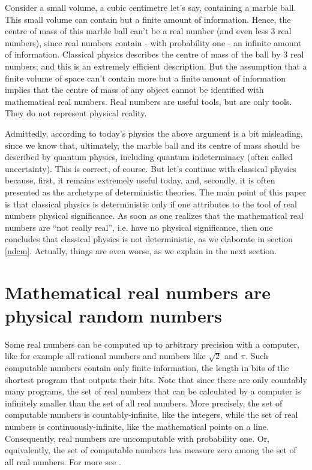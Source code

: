 \documentclass[pra,aps,groupedaddress,twocolumn,floatfix,nofootinbib]{revtex4}
\begin{document}
Consider a small volume, a cubic centimetre let's say, containing a marble ball. This small volume can contain but a finite amount of information. Hence, the centre of mass of this marble ball can't be a real number (and even less 3 real numbers), since real numbers contain - with probability one - an infinite amount of information. Classical physics describes the centre of mass of the ball by 3 real numbers; and this is an extremely efficient description. But the assumption that a finite volume of space can't contain more but a finite amount of information implies that the centre of mass of any object cannot be identified with mathematical real numbers. Real numbers are useful tools, but are only tools. They do not represent physical reality. 

Admittedly, according to today's physics the above argument is a bit misleading, since we know that, ultimately, the marble ball and its centre of mass should be described by quantum physics, including quantum indeterminacy (often called uncertainty). This is correct, of course. But let's continue with classical physics because, first, it remains extremely useful today, and, secondly, it is often presented as the archetype of deterministic theories. The main point of this paper is that classical physics is deterministic only if one attributes to the tool of real numbers physical significance. As soon as one realizes that the mathematical real numbers are ``not really real'', i.e. have no physical significance, then one concludes that classical physics is not deterministic, as we elaborate in section \ref{ndcm}. Actually, things are even worse, as we explain in the next section.



\section{Mathematical real numbers are physical random numbers}\label{randomNb}
Some real numbers can be computed up to arbitrary precision with a computer, like for example all rational numbers and numbers like $\sqrt{2}$ and $\pi$. Such computable numbers contain only finite information, the length in bits of the shortest program that outputs their bits. Note that since there are only countably many programs, the set of real numbers that can be calculated by a computer is infinitely smaller than the set of all real numbers. More precisely, the set of computable numbers is countably-infinite, like the integers, while the set of real numbers is continuously-infinite, like the mathematical points on a line. Consequently, real numbers are uncomputable with probability one. Or, equivalently, the set of computable numbers has measure zero among the set of all real numbers. For more see \cite{Chaitin}.
\end{document}
